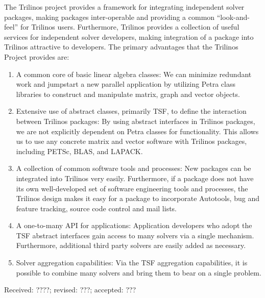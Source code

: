 \documentclass[acmtoms,acmnow]{acmtrans2m}
\newcommand{\bsinglespace}{\renewcommand{\baselinestretch}{1.2}\small\normalsize}
\newcommand{\esinglespace}{}
\begin{document}
The Trilinos project provides a framework for integrating independent 
solver packages, making packages inter-operable and providing a 
common ``look-and-feel'' 
for Trilinos users.  Furthermore, Trilinos provides a collection 
of useful services for
independent solver developers, making integration of a package into 
Trilinos 
attractive to developers.
The primary advantages that the Trilinos Project provides are:
\begin{enumerate}
\item A common core of basic linear algebra classes:
We can minimize redundant work and jumpstart a new parallel application
by utilizing Petra class libraries to construct 
and manipulate matrix, graph and vector objects.
\item Extensive use of abstract classes, primarily TSF, to define the 
interaction between Trilinos
packages:  By using abstract interfaces in Trilinos packages, we are
not explicitly dependent on Petra classes for functionality.  
This allows us to use any
concrete matrix and vector software with Trilinos packages, 
including PETSc, BLAS, 
and LAPACK.
\item A collection of common software tools and processes: New packages can be 
integrated into Trilinos very easily.  Furthermore, if a package 
does not have its own well-developed set of software engineering tools
and processes, the Trilinos design makes it easy for a package to 
incorporate Autotools, bug and feature tracking,
source code control and mail lists.
\item A one-to-many API for applications: Application developers who 
adopt the TSF abstract interfaces gain access to many solvers via a 
single mechanism.  Furthermore, additional third
party solvers are easily added as necessary.
\item Solver aggregation capabilities:  Via the TSF aggregation 
capabilities, it is possible
to combine many solvers and bring them to bear on a single problem.
\end{enumerate}

{\bsinglespace

\nopagebreak
\scriptsize

\esinglespace}

\begin{received}
Received: ????; revised: ???; accepted: ???
\end{received}
\end{document}
